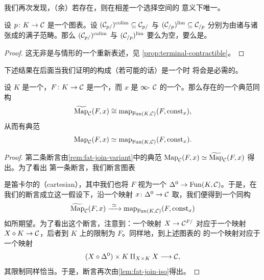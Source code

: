 我们再次发现，（余）\trLimit{}若存在，则在相差一个\trContractible{}选择空间的
意义下唯一。

\begin{lemma}\label{lem:colim-cones-contractible}
设 $p\colon K \to \mathcal{C}$ 是一个图表。设
$(\mathcal{C}_{p/})^{\mathrm{colim}} \subseteq \mathcal{C}_{p/}$ 与
$(\mathcal{C}_{/p})^{\mathrm{lim}} \subseteq \mathcal{C}_{/p}$ 分别为由诸\trColimit{}\trCone{}与诸%
\trLimit{}\trCocone{}张成的满子范畴。那么 $(\mathcal{C}_{p/})^{\mathrm{colim}}$
与 $(\mathcal{C}_{/p})^{\mathrm{lim}}$ 要么为空，要么是\trContractible{}\trKanComplex{}。
\end{lemma}

\begin{proof}
这无非是\trInitialObject{}与\trTerminalObject{}情形的一个重新表述，见%
\cref{prop:terminal-contractible}。
\end{proof}

下述结果在后面当我们证明\trColimit{}的构成（若可能的话）是一个\trFunctor{}时
将会是必需的。

\begin{proposition}\label{prop:map-fun-mapping-space}
设 $K$ 是一个\trSimplicialSet{}，$F\colon K \to \mathcal{C}$ 是一个\trFunctor{}，而 $x$ 是
∞-\trCategory{} $\mathcal{C}$ 的一个\trObject{}。那么存在\trSimplicialSets{}的一个典范同构
\[
\widetilde{\mathrm{Map}}_{\mathcal{C}}(F, x) \cong
  \mathrm{map}_{\mathrm{Fun}(K, \mathcal{C})}(F, \mathrm{const}_x),
\]
从而有典范\trHomotopyEquivalence{}%
\[
\mathrm{Map}_{\mathcal{C}}(F, x) \simeq
  \mathrm{map}_{\mathrm{Fun}(K, \mathcal{C})}(F, \mathrm{const}_x).
\]
\end{proposition}

\begin{proof}
第二条断言由\cref{rem:fat-join-variant}中的典范\trHomotopyEquivalence{}%
$\mathrm{Map}_{\mathcal{C}}(F, x) \simeq \widetilde{\mathrm{Map}}_{\mathcal{C}}(F, x)$ 得出。为了看出
第一条断言，我们断言图表
\begin{center}
\end{center}
是笛卡尔的（cartesian），其中我们也将 $F$ 视为一个\trFunctor{}%
$\Delta^0 \to \mathrm{Fun}(K, \mathcal{C})$。于是，在我们的断言成立这一假设下，沿一个映射
$x\colon \Delta^0 \to \mathcal{C}$ 取\trPullback{}，我们便得到一个同构
\[
\widetilde{\mathrm{Map}}_{\mathcal{C}}(F, x) \xrightarrow{\ \simeq\ }
  \mathrm{map}_{\mathrm{Fun}(K, \mathcal{C})}(F, \mathrm{const}_x)
\]
如所期望。为了看出这个断言，注意到：一个映射 $X \to \mathcal{C}^{F/}$ 对应于一个映射
$X \diamond K \to \mathcal{C}$，后者到 $K$ 上的限制为 $F$。同样地，到上述图表的%
\trPullback{}的一个映射对应于一个映射
\[
(X \diamond \Delta^0) \times K \amalg_{X \times K} X \longrightarrow \mathcal{C},
\]
其限制同样恰当。于是，断言再次由\cref{lem:fat-join-iso}得出。
\end{proof}

